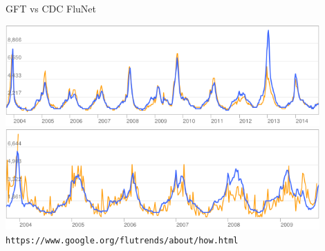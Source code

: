 \documentclass[11pt,compress,aspectratio=1610]{beamer}
\begin{document}
\begin{frame}{GFT vs CDC FluNet}
\begin{center}
	\includegraphics[width=0.9\textwidth,height=0.43\textheight,keepaspectratio=true]{../images/us_ili_gft_cdc.png}
    \\
    \includegraphics[width=0.9\textwidth,height=0.43\textheight,keepaspectratio=true]{../images/canada_ili_gft_phac.png}
    \\
    {\scriptsize \texttt{https://www.google.org/flutrends/about/how.html} }
\end{center}
\end{frame}
\end{document}
